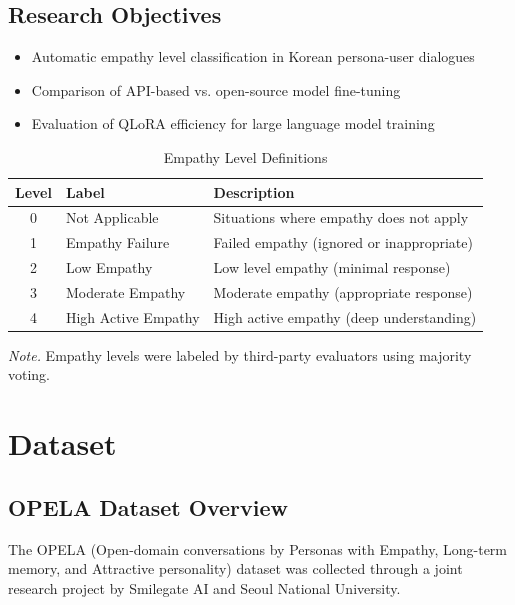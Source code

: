 \documentclass[11pt, a4paper]{article}
\begin{document}
\subsection{Research Objectives}
\begin{itemize}
    \item Automatic empathy level classification in Korean persona-user dialogues
    \item Comparison of API-based vs. open-source model fine-tuning
    \item Evaluation of QLoRA efficiency for large language model training
\end{itemize}

\begin{table}[H]
\centering
\caption{Empathy Level Definitions}
\label{tab:empathy_levels}
\begin{tabular}{clp{8cm}}
\toprule
\textbf{Level} & \textbf{Label} & \textbf{Description} \\
\midrule
0 & Not Applicable & Situations where empathy does not apply \\
1 & Empathy Failure & Failed empathy (ignored or inappropriate) \\
2 & Low Empathy & Low level empathy (minimal response) \\
3 & Moderate Empathy & Moderate empathy (appropriate response) \\
4 & High Active Empathy & High active empathy (deep understanding) \\
\bottomrule
\end{tabular}

\vspace{0.5em}
\footnotesize\textit{Note.} Empathy levels were labeled by third-party evaluators using majority voting.
\end{table}

\section{Dataset}

\subsection{OPELA Dataset Overview}
The OPELA (Open-domain conversations by Personas with Empathy, Long-term memory, and Attractive personality) dataset was collected through a joint research project by Smilegate AI and Seoul National University.
\end{document}
